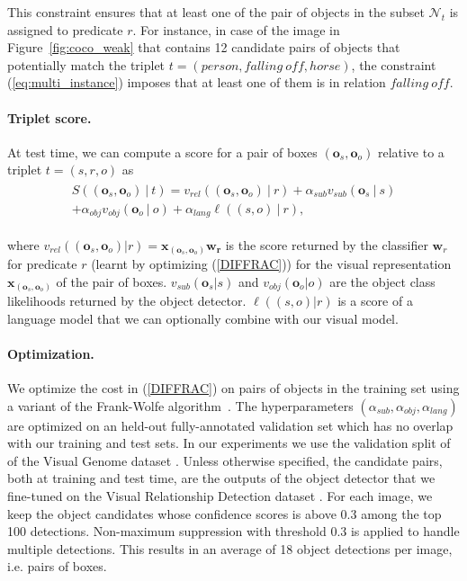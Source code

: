 \documentclass[10pt,twocolumn,letterpaper]{article}
\newcommand{\spaceparagraph}{\vspace{-.35cm}}
\begin{document}
This constraint ensures that at least one of the pair of objects in the subset $\mathcal{N}_t$ is assigned to predicate $r$. For instance, in case of the image in Figure~\ref{fig:coco_weak} that contains 12 candidate pairs of objects that potentially match the triplet $t=(person,falling~off,horse)$, the constraint (\ref{eq:multi_instance}) imposes that at least one of them is in relation $falling ~off$. 




\spaceparagraph
\paragraph{Triplet score.} 
At test time, we can compute a score for a pair of boxes $(\bm{o}_s,\bm{o}_o)$ relative to a triplet $t=(s,r,o)$ as
\begin{align}
\label{eq:score}
\begin{split}
S((\bm{o}_s,\bm{o}_o) ~|~ t) = v_{rel}((\bm{o}_s,\bm{o}_o) ~|~ r) + \alpha_{sub} v_{sub}(\bm{o}_s ~|~ s) \\ + \alpha_{obj} v_{obj}(\bm{o}_o ~|~ o) + \alpha_{lang} \ell((s,o) ~|~ r),
\end{split}
\end{align}
\vspace{-0.4cm}


\noindent where $v_{rel}((\bm{o}_s,\bm{o}_o) | r) = \mathbf{x}_{(\bm{o}_s,\bm{o}_o)} \mathbf{w_r}$
is the score returned by the classifier $\mathbf{w}_r$ for predicate $r$ (learnt by optimizing (\ref{DIFFRAC})) for the visual representation $\mathbf{x}_{(\bm{o}_s,\bm{o}_o)}$ of the pair of boxes. $v_{sub}(\bm{o}_s | s)$ and $v_{obj}(\bm{o}_o | o)$ are the object class likelihoods returned by the object detector. $\ell((s,o) | r)$ is a score of a language model that we can optionally combine with our visual model. 


\spaceparagraph
\paragraph{Optimization.} We optimize the cost in (\ref{DIFFRAC}) on pairs of objects in the training set using a variant of the Frank-Wolfe algorithm~\cite{miech17,Osokin16}. The hyperparameters $(\alpha_{sub}, \alpha_{obj}, \alpha_{lang})$ are optimized on an held-out fully-annotated validation set which has no overlap with our training and test sets. In our experiments we use the validation split of \cite{Johnson2015} of the Visual Genome dataset \cite{Krishna2016}. Unless otherwise specified, the candidate pairs, both at training and test time, are the outputs of the object detector \cite{girshick15fastrcnn} that we fine-tuned on the Visual Relationship Detection dataset \cite{Lu16}. For each image, we keep the object candidates whose confidence scores is above 0.3 among the top 100 detections. Non-maximum suppression with threshold 0.3 is applied to handle multiple detections. This results in an average of 18 object detections per image, i.e. pairs of boxes.
\end{document}
